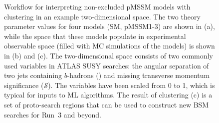 \documentclass[letter, USenglish, 11pt, subfigure]{article}
\begin{document}
\begin{figure}[!htbp]
  \centering
  
  \caption{Workflow for interpreting non-excluded pMSSM models with clustering in an example two-dimensional space. The two theory parameter values for four models (SM, pMSSM1-3) are shown in (a), while the space that these models populate in experimental observable space (filled with MC simulations of the models) is shown in (b) and (c). The two-dimensional space consists of two commonly used variables in ATLAS SUSY searches: the angular separation of two jets containing $b$-hadrons (\drbb) and missing transverse momentum significance ($\mathcal{S}$). The variables have been scaled from 0 to 1, which is typical for inputs to ML algorithms. The result of clustering (c) is a set of proto-search regions that can be used to construct new BSM searches for Run~3 and beyond.}
  \label{fig:clusteringWorkflow}
\end{figure}
\end{document}
